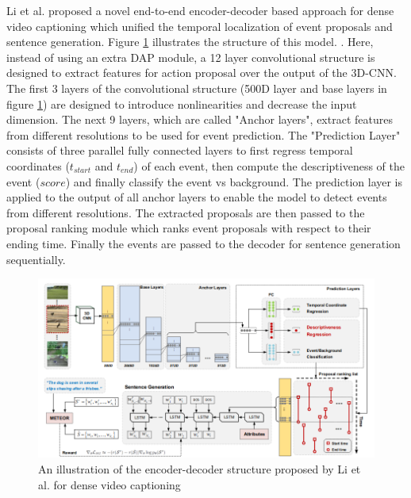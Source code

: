 \documentclass[preprint, 12pt]{elsarticle}
\begin{document}
		Li et al. \cite{li2018jointly} proposed a novel end-to-end encoder-decoder based approach for dense video captioning which unified the temporal localization of event proposals and sentence generation\cite{li2018jointly}. Figure \ref{fig:dense2} illustrates the structure of this model. \cite{li2018jointly}. Here, instead of using an extra DAP module, a 12 layer convolutional structure is designed to extract features for action proposal over the output of the 3D-CNN. The first 3 layers of the convolutional structure (500D layer and base layers in figure \ref{fig:dense2}) are designed to introduce nonlinearities and decrease the input dimension. The next 9 layers, which are called "Anchor layers", extract features from different resolutions to be used for event prediction. The "Prediction Layer" consists of three parallel fully connected layers to first regress temporal coordinates ($t_{start}$ and $t_{end}$) of each event, then compute the descriptiveness of the event ($score$) and finally classify the event vs background. The prediction layer is applied to the output of all anchor layers to enable the model to detect events from different resolutions. The extracted proposals are then passed to the proposal ranking module which ranks event proposals with respect to their ending time. Finally the events are passed to the decoder for sentence generation sequentially.
		
		\begin{figure}[h]
			\centering
			\includegraphics[scale=0.5]{Imgs/dense2.png}
			\caption{An illustration of the encoder-decoder structure proposed by Li et al. for dense video captioning \cite{li2018jointly}}
			\label{fig:dense2}
		\end{figure}
	
\end{document}
